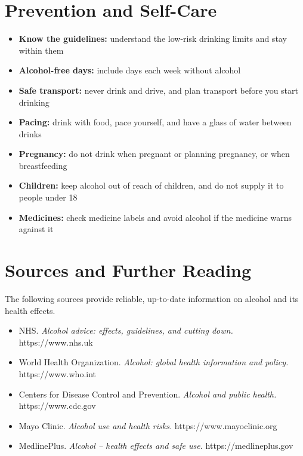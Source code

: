 \section*{Prevention and Self-Care}
\begin{itemize}
    \item \textbf{Know the guidelines:} understand the low-risk drinking limits and stay within them
    \item \textbf{Alcohol-free days:} include days each week without alcohol
    \item \textbf{Safe transport:} never drink and drive, and plan transport before you start drinking
    \item \textbf{Pacing:} drink with food, pace yourself, and have a glass of water between drinks
    \item \textbf{Pregnancy:} do not drink when pregnant or planning pregnancy, or when breastfeeding
    \item \textbf{Children:} keep alcohol out of reach of children, and do not supply it to people under 18
    \item \textbf{Medicines:} check medicine labels and avoid alcohol if the medicine warns against it
\end{itemize}

\section*{Sources and Further Reading}
The following sources provide reliable, up-to-date information on alcohol and its health effects.

\begin{itemize}
    \item NHS. \textit{Alcohol advice: effects, guidelines, and cutting down.} https://www.nhs.uk
    \item World Health Organization. \textit{Alcohol: global health information and policy.} https://www.who.int
    \item Centers for Disease Control and Prevention. \textit{Alcohol and public health.} https://www.cdc.gov
    \item Mayo Clinic. \textit{Alcohol use and health risks.} https://www.mayoclinic.org
    \item MedlinePlus. \textit{Alcohol -- health effects and safe use.} https://medlineplus.gov
\end{itemize}
